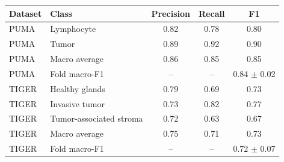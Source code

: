 \begin{tabular}{llccc}
\toprule
Dataset & Class & Precision & Recall & F1 \\
\midrule
PUMA & Lymphocyte & 0.82 & 0.78 & 0.80 \\
PUMA & Tumor & 0.89 & 0.92 & 0.90 \\
PUMA & Macro average & 0.86 & 0.85 & 0.85 \\
PUMA & Fold macro-F1 & -- & -- & 0.84 $\pm$ 0.02 \\
TIGER & Healthy glands & 0.79 & 0.69 & 0.73 \\
TIGER & Invasive tumor & 0.73 & 0.82 & 0.77 \\
TIGER & Tumor-associated stroma & 0.72 & 0.63 & 0.67 \\
TIGER & Macro average & 0.75 & 0.71 & 0.73 \\
TIGER & Fold macro-F1 & -- & -- & 0.72 $\pm$ 0.07 \\
\bottomrule
\end{tabular}
